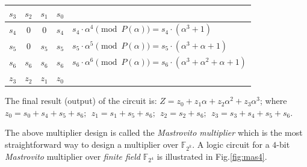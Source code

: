 \begin{Example}
{\begin{tabular}{|c c c c | l }
  $s_3$ 	&$s_2$  	&$s_1$   &$s_0$ 	&   \\
 \hline
 $s_4$ 		&$0$		&$0$ 	 &$s_4$  	&$s_4\cdot \alpha^4 \pmod{P(\alpha)} = s_4 \cdot (\alpha^3 + 1)$\\
 $s_5$ 		&$0$		&$s_5$   &$s_5$     &$s_5\cdot \alpha^5 \pmod{P(\alpha)} = s_5\cdot (\alpha^3+ \alpha + 1)$\\
 $s_6$ 		&$s_6$		&$s_6$   &$s_6$     &$s_6\cdot \alpha^6 \pmod{ P(\alpha)} = s_6\cdot( \alpha^3 + \alpha^2 + \alpha + 1)$\\
 \hline
 $z_3$ 		&$z_2$ 		&$z_1$   &$z_0$ 	&
 \end{tabular}\par}


The final result (output) of the circuit is: $Z = z_0 + z_1 \alpha + z_2
\alpha^2 + z_3 \alpha^3$; where  $z_0=s_0+s_4+s_5+s_6; ~~z_1=s_1+s_5+s_6;
~~z_2=s_2+s_6; ~~z_3=s_3+s_4+s_5+s_6$. 
\end{Example}


The above multiplier design is called the {\it Mastrovito multiplier} \cite{mastro:1989} 
which is the most straightforward way to design a multiplier over $\mathbb{F}_{2^k}$. 
A logic circuit for a $4$-bit {\it Mastrovito} multiplier over {\it finite field} $\mathbb{F}_{2^4}$ is illustrated in Fig.\ref{fig:mas4}.

